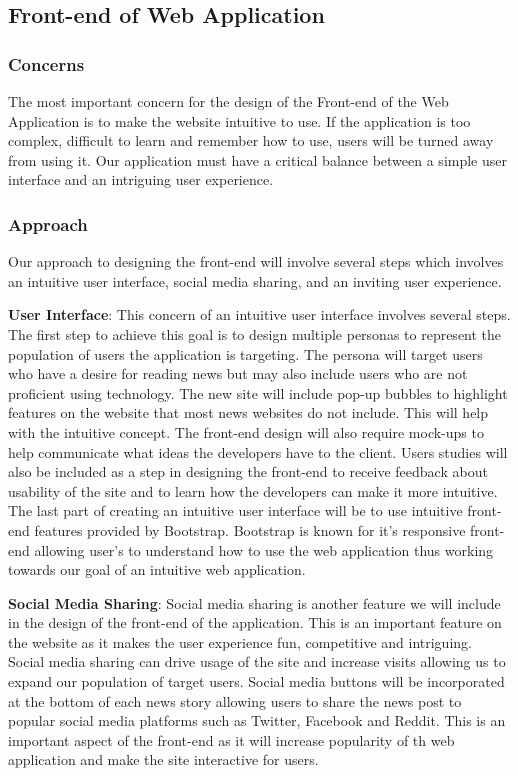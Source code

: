 \documentclass[onecolumn, draftclsnofoot,10pt, compsoc]{IEEEtran}
\begin{document}
\subsection{Front-end of Web Application}
\subsubsection{Concerns}
The most important concern for the design of the Front-end of the Web Application is to make the website intuitive to use. If the application is too complex, difficult to learn and remember how to use, users will be turned away from using it. Our application must have a critical balance between a simple user interface and an intriguing user experience.

\subsubsection{Approach}
Our approach to designing the front-end will involve several steps which involves an intuitive user interface, social media sharing, and an inviting user experience. 

\hangindent=0.5cm \textbf{User Interface}:
This concern of an intuitive user interface involves several steps. The first step to achieve this goal is to design multiple personas to represent the population of users the application is targeting. The persona will target users who have a desire for reading news but may also include users who are not proficient using technology. The new site will include pop-up bubbles to highlight features on the website that most news websites do not include. This will help with the intuitive concept. The front-end design will also require mock-ups to help communicate what ideas the developers have to the client. Users studies will also be included as a step in designing the front-end to receive feedback about usability of the site and to learn how the developers can make it more intuitive. The last part of creating an intuitive user interface will be to use intuitive front-end features provided by Bootstrap. Bootstrap is known for it’s responsive front-end allowing user’s to understand how to use the web application thus working towards our goal of an intuitive web application.

\hangindent=0.5cm \textbf{Social Media Sharing}:
Social media sharing is another feature we will include in the design of the front-end of the application. This is an important feature on the website as it makes the user experience fun, competitive and intriguing. Social media sharing can drive usage of the site and increase visits allowing us to expand our population of target users. Social media buttons will be incorporated at the bottom of each news story allowing users to share the news post to popular social media platforms such as Twitter, Facebook and Reddit. This is an important aspect of the front-end as it will increase popularity of th web application and make the site interactive for users.
\end{document}
